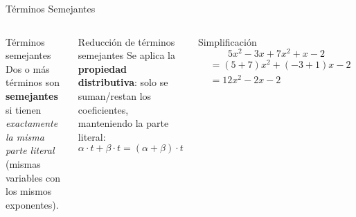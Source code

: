 \documentclass[12pt, aspectratio=169]{beamer}
\begin{document}
\begin{frame}{Términos Semejantes}
  \begin{columns}[T]
    \begin{definicion}{Términos semejantes}
      Dos o más términos son \textbf{semejantes} si tienen \emph{exactamente la misma parte literal} (mismas variables con los mismos exponentes).
    \end{definicion}
    \vspace{6pt}


    \begin{propiedad}{Reducción de términos semejantes}
      Se aplica la \textbf{propiedad distributiva}: solo se suman/restan los coeficientes, manteniendo la parte literal:
      \[
        \alpha \cdot t + \beta \cdot t = (\alpha + \beta)\cdot t
      \]
    \end{propiedad}
    \vspace{6pt}
    \begin{ejercicio}{Simplificación}
      \small
      \[
        5x^2 - 3x + 7x^2 + x - 2
      \]
      \begin{align*}
        &= (5+7)x^2 + (-3+1)x - 2\\
        &= \boxed{12x^2 - 2x - 2}
      \end{align*}
    \end{ejercicio}
  \end{columns}
\end{frame}
\end{document}
